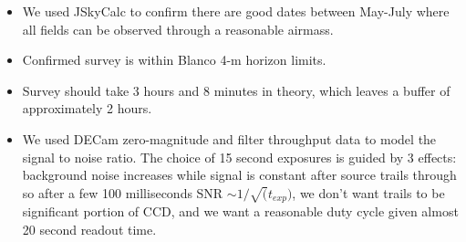\documentclass[11pt]{article}
\begin{document}
\begin{itemize}
	\item We used JSkyCalc to confirm there are good dates between May-July where all fields can be observed through a reasonable airmass. 
	\item Confirmed survey is within Blanco 4-m horizon limits.
	\item Survey should take 3 hours and 8 minutes in theory, which leaves a buffer of approximately 2 hours.
	\item We used DECam zero-magnitude and filter throughput data to model the signal to noise ratio. The choice of 15 second exposures is guided by 3 effects: background noise increases while signal is constant after source trails through so after a few 100 milliseconds SNR $\sim 1/\sqrt(t_{exp})$, we don't want trails to be significant portion of CCD, and we want a reasonable duty cycle given almost 20 second readout time. 
\end{itemize}

%
%
\end{document}
